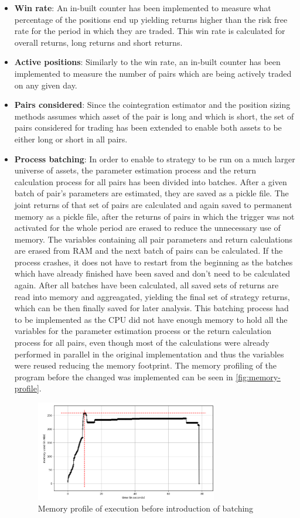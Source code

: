 \begin{itemize}
    \item \textbf{Win rate}: An in-built counter has been implemented to measure what percentage of the positions end up yielding returns higher than the risk free rate for the period in which they are traded. This win rate is calculated for overall returns, long returns and short returns. 
    \item \textbf{Active positions}: Similarly to the win rate, an in-built counter has been implemented to measure the number of pairs which are being actively traded on any given day.  
    \item \textbf{Pairs considered}: Since the cointegration estimator and the position sizing methods assumes which asset of the pair is long and which is short, the set of pairs considered for trading has been extended to enable both assets to be either long or short in all pairs. 
    \item \textbf{Process batching}: In order to enable to strategy to be run on a much larger universe of assets, the parameter estimation process and the return calculation process for all pairs has been divided into batches. After a given batch of pair's parameters are estimated, they are saved as a pickle file. The joint returns of that set of pairs are calculated and again saved to permanent memory as a pickle file, after the returns of pairs in which the trigger was not activated for the whole period are erased to reduce the unnecessary use of memory. The variables containing all pair parameters and return calculations are erased from RAM and the next batch of pairs can be calculated. If the process crashes, it does not have to restart from the beginning as the batches which have already finished have been saved and don't need to be calculated again. After all batches have been calculated, all saved sets of returns are read into memory and aggreagated, yielding the final set of strategy returns, which can be then finally saved for later analysis. This batching process had to be implemented as the CPU did not have enough memory to hold all the variables for the parameter estimation process or the return calculation process for all pairs, even though most of the calculations were already performed in parallel in the original implementation and thus the variables were reused reducing the memory footprint. The memory profiling of the program before the changed was implemented can be seen in \autoref{fig:memory-profile}.
    \begin{figure}[ht]
        \centering
        \includegraphics[width=300px]{assets/memory-profile.png}
        \caption{Memory profile of execution before introduction of batching}
        \label{fig:memory-profile}
    \end{figure}
\end{itemize}